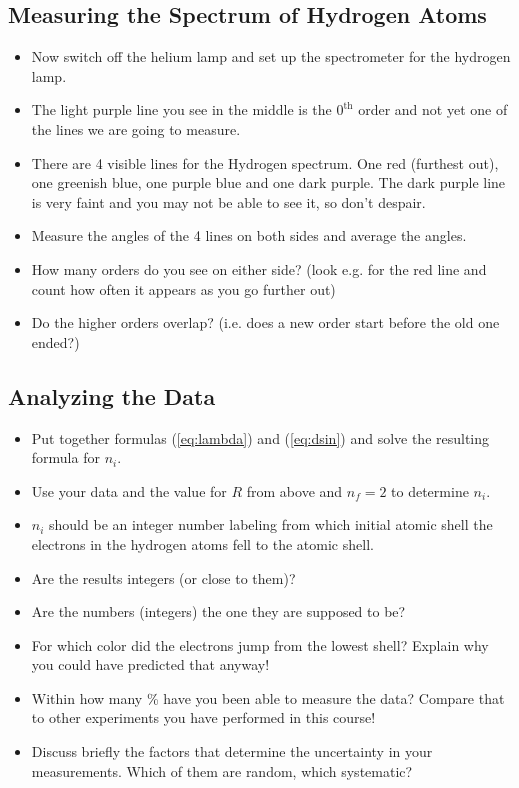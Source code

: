 \subsection{Measuring the Spectrum of Hydrogen Atoms}
\begin{itemize}
\item Now switch off the helium lamp and set up the spectrometer for the hydrogen lamp.

\item The light purple line you see in the middle is the $0^{\mathrm{th}}$ order and not yet one of the lines we are going to measure.

\item There are 4 visible lines for the Hydrogen spectrum. One red (furthest out), one greenish blue, one purple blue and one dark purple. The dark purple line is very
faint and you may not be able to see it, so don't despair.

\item Measure the angles of the 4 lines on both sides and average the angles.

\item How many orders do you see on either side? (look e.g. for the red line and count how often it appears as you go further out)

\item Do the higher orders overlap? (i.e. does a new order start before the old one ended?)
\end{itemize}

\subsection{Analyzing the Data}
\begin{itemize}
\item Put together formulas ({\ref{eq:lambda}}) and ({\ref{eq:dsin}}) and solve the resulting formula for $n_i$. 
\item Use your data and the value for $R$ from above and $n_f=2$ to determine $n_i$.
\item $n_i$ should be an integer number labeling from which initial atomic shell the electrons in the hydrogen atoms fell to the  atomic shell.
\item Are the results integers (or close to them)?
\item Are the numbers (integers) the one they are supposed to be?
\item For which color did the electrons jump from the lowest shell? Explain why you could have predicted that anyway!
\item Within how many \% have you been able to measure the data? Compare that to other experiments you have performed in this course!
\item Discuss briefly the factors that determine the uncertainty in your measurements. Which of them are random, which systematic?
\end{itemize}

